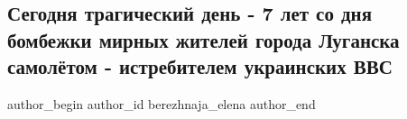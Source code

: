  
 
 
 
 
 
\subsection{Сегодня трагический день - 7 лет со дня бомбежки мирных жителей города Луганска  самолётом - истребителем  украинских ВВС}
\label{sec:02_06_2021.fb.berezhnaja_elena.1.7_let_aviaudar_lugansk}
\ifcmt
 author_begin
   author_id berezhnaja_elena
 author_end
\fi


